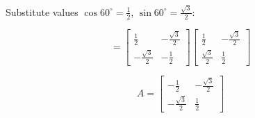 \documentclass{ximera}
\begin{document}
\begin{enumerate}
\noindent Substitute values \(\cos 60^\circ = \frac{1}{2}\), \(\sin 60^\circ = \frac{\sqrt{3}}{2}\):

\[
=
\begin{bmatrix}
\frac{1}{2} & -\frac{\sqrt{3}}{2} \\
-\frac{\sqrt{3}}{2} & -\frac{1}{2}
\end{bmatrix}
\begin{bmatrix}
\frac{1}{2} & -\frac{\sqrt{3}}{2} \\
\frac{\sqrt{3}}{2} & \frac{1}{2}
\end{bmatrix}
\]

\[
\boxed{
A=
\begin{bmatrix}
-\frac{1}{2} & -\frac{\sqrt{3}}{2} \\
-\frac{\sqrt{3}}{2} & \frac{1}{2}
\end{bmatrix}}
\]

\end{enumerate}
\end{document}
